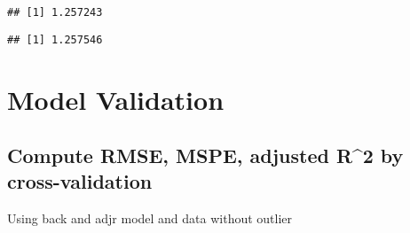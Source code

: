 \documentclass[
]{article}
\newenvironment{Shaded}{\begin{snugshade}}{\end{snugshade}}
\newcommand{\CommentTok}[1]{\textcolor[rgb]{0.56,0.35,0.01}{\textit{#1}}}
\newcommand{\DecValTok}[1]{\textcolor[rgb]{0.00,0.00,0.81}{#1}}
\newcommand{\FunctionTok}[1]{\textcolor[rgb]{0.00,0.00,0.00}{#1}}
\newcommand{\NormalTok}[1]{#1}
\newcommand{\OtherTok}[1]{\textcolor[rgb]{0.56,0.35,0.01}{#1}}
\newcommand{\SpecialCharTok}[1]{\textcolor[rgb]{0.00,0.00,0.00}{#1}}
\begin{document}
\begin{verbatim}
## [1] 1.257243
\end{verbatim}

\begin{Shaded}
\end{Shaded}

\begin{verbatim}
## [1] 1.257546
\end{verbatim}

\hypertarget{model-validation}{%
\section{Model Validation}\label{model-validation}}

\hypertarget{compute-rmse-mspe-adjusted-r2-by-cross-validation}{%
\subsection{Compute RMSE, MSPE, adjusted R\^{}2 by
cross-validation}\label{compute-rmse-mspe-adjusted-r2-by-cross-validation}}

Using back and adjr model and data without outlier
\end{document}
